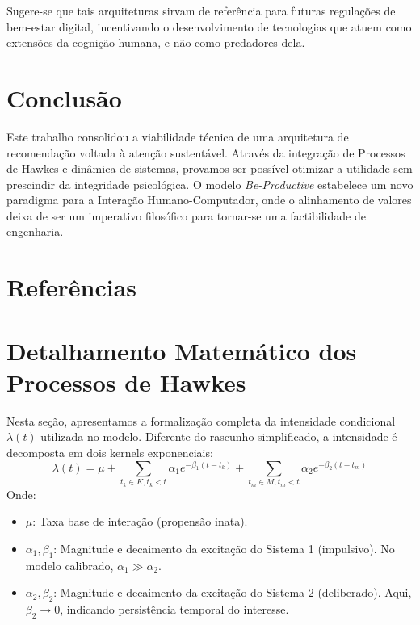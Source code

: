 Sugere-se que tais arquiteturas sirvam de referência para futuras regulações de bem-estar digital, incentivando o desenvolvimento de tecnologias que atuem como extensões da cognição humana, e não como predadores dela.

\section{Conclusão}

Este trabalho consolidou a viabilidade técnica de uma arquitetura de recomendação voltada à atenção sustentável. Através da integração de Processos de Hawkes e dinâmica de sistemas, provamos ser possível otimizar a utilidade sem prescindir da integridade psicológica. O modelo \textit{Be-Productive} estabelece um novo paradigma para a Interação Humano-Computador, onde o alinhamento de valores deixa de ser um imperativo filosófico para tornar-se uma factibilidade de engenharia.

\section*{Referências}
\printbibliography[heading=none]

\newpage

\appendix
\section{Detalhamento Matemático dos Processos de Hawkes}

Nesta seção, apresentamos a formalização completa da intensidade condicional $\lambda(t)$ utilizada no modelo. Diferente do rascunho simplificado, a intensidade é decomposta em dois kernels exponenciais:
\begin{equation}
\lambda(t) = \mu + \sum_{t_k \in K, t_k < t} \alpha_1 e^{-\beta_1(t-t_k)} + \sum_{t_m \in M, t_m < t} \alpha_2 e^{-\beta_2(t-t_m)}
\end{equation}
Onde:
\begin{itemize}
    \item $\mu$: Taxa base de interação (propensão inata).
    \item $\alpha_1, \beta_1$: Magnitude e decaimento da excitação do Sistema 1 (impulsivo). No modelo calibrado, $\alpha_1 \gg \alpha_2$.
    \item $\alpha_2, \beta_2$: Magnitude e decaimento da excitação do Sistema 2 (deliberado). Aqui, $\beta_2 \to 0$, indicando persistência temporal do interesse.
\end{itemize}

